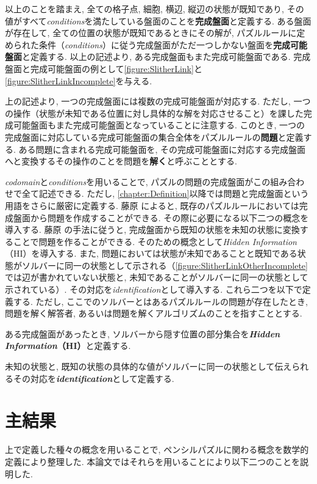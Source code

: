 以上のことを踏まえ, 全ての格子点, 細胞, 横辺, 縦辺の状態が既知であり, その値がすべて\textit{conditions}を満たしている盤面のことを\textbf{完成盤面}と定義する. ある盤面が存在して, 全ての位置の状態が既知であるときにその解が, パズルルールに定められた条件（\textit{conditions}）に従う完成盤面がただ一つしかない盤面を\textbf{完成可能盤面}と定義する. 以上の記述より, ある完成盤面もまた完成可能盤面である. 完成盤面と完成可能盤面の例として\cref{figure:SlitherLink}と\cref{figure:SlitherLinkIncomplete}を与える.

上の記述より, 一つの完成盤面には複数の完成可能盤面が対応する. ただし, 一つの操作（状態が未知である位置に対し具体的な解を対応させること）を課した完成可能盤面もまた完成可能盤面となっていることに注意する. このとき, 一つの完成盤面に対応している完成可能盤面の集合全体をパズルルールの\textbf{問題}と定義する. ある問題に含まれる完成可能盤面を, その完成可能盤面に対応する完成盤面へと変換するその操作のことを問題を\textbf{解く}と呼ぶこととする.

\textit{codomain}と\textit{conditions}を用いることで, パズルの問題の完成盤面がこの組み合わせで全て記述できる. ただし, \cref{chapter:Definition}以降では問題と完成盤面という用語をさらに厳密に定義する. 藤原 \cite{Fujiwara2022}によると, 既存のパズルルールにおいては完成盤面から問題を作成することができる. その際に必要になる以下二つの概念を導入する. 藤原 \cite{Fujiwara2022}の手法に従うと, 完成盤面から既知の状態を未知の状態に変換することで問題を作ることができる. そのための概念として\textit{Hidden Information}（HI）を導入する. また, 問題においては状態が未知であることと既知である状態がソルバーに同一の状態として示される（\cref{figure:SlitherLinkOtherIncomplete}では辺が書かれていない状態と, 未知であることがソルバーに同一の状態として示されている）. その対応を\textit{identification}として導入する. これら二つを以下で定義する. ただし, ここでのソルバーとはあるパズルルールの問題が存在したとき, 問題を解く解答者, あるいは問題を解くアルゴリズムのことを指すこととする.
\begin{definition}
  ある完成盤面があったとき, ソルバーから隠す位置の部分集合を\textbf{\textit{Hidden Information}（HI）}と定義する.
\end{definition}
\begin{definition}
  未知の状態と, 既知の状態の具体的な値がソルバーに同一の状態として伝えられるその対応を\textbf{\textit{identification}}として定義する.
\end{definition}

\section{主結果}
上で定義した種々の概念を用いることで, ペンシルパズルに関わる概念を数学的定義により整理した. 本論文ではそれらを用いることにより以下二つのことを説明した.

